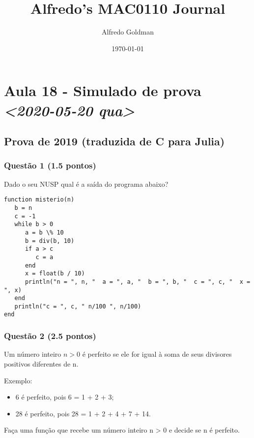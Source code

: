 \documentclass[a4paper]{article}
\author{Alfredo Goldman}
\date{\today}
\title{Alfredo's MAC0110 Journal}
\begin{document}
\maketitle


\section{Aula 18 - Simulado de prova \textit{<2020-05-20 qua>}}
\label{sec:org648dad0}
\subsection{Prova de 2019 (traduzida de C para Julia)}
\label{sec:org5f1c2ef}
\subsubsection{Questão 1 (1.5 pontos)}
\label{sec:org4d6b3f5}
Dado o seu NUSP qual é a saída do programa abaixo?
\lstset{language=ein-julia,label= ,caption= ,captionpos=b,numbers=none}
\begin{lstlisting}
function misterio(n)
   b = n
   c = -1
   while b > 0
      a = b \% 10
      b = div(b, 10)
      if a > c
         c = a
      end
      x = float(b / 10)
      println("n = ", n, "  a = ", a, "  b = ", b, "  c = ", c, "  x = ", x)
   end
   println("c = ", c, " n/100 ", n/100)
end
\end{lstlisting}

\subsubsection{Questão 2 (2.5 pontos)}
\label{sec:org9dcd571}
Um número inteiro $n > 0$ é perfeito se ele for igual à soma de seus divisores
positivos diferentes de n.

Exemplo:
\begin{itemize}
\item 6 é perfeito, pois 6 = 1 + 2 + 3;
\item 28 é perfeito, pois 28 = 1 + 2 + 4 + 7 + 14.
\end{itemize}

Faça uma função que recebe um número inteiro n > 0 e decide se n é perfeito.
\end{document}
